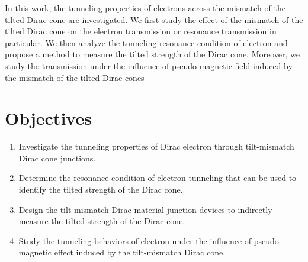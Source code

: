     In this work, the tunneling properties of electrons across the mismatch of the tilted Dirac cone are investigated. 
    We first study the effect of the mismatch of the tilted Dirac cone on the electron transmission or resonance transmission in particular. 
    We then analyze the tunneling resonance condition of electron and propose a method to measure the tilted strength of the Dirac cone. 
    Moreover, we study the transmission under the influence of pseudo-magnetic field induced by the mismatch of the tilted Dirac cones
\section{Objectives}
    \begin{enumerate}
        \item Investigate the tunneling properties of Dirac electron through tilt-mismatch Dirac cone junctions.
        \item Determine the resonance condition of electron tunneling that can be used to identify the tilted strength of the Dirac cone.
        \item Design the tilt-mismatch Dirac material junction devices to indirectly measure the tilted strength of the Dirac cone.
        \item Study the tunneling behaviors of electron under the influence of pseudo magnetic effect induced by the tilt-mismatch Dirac cone.  
    \end{enumerate}
    


